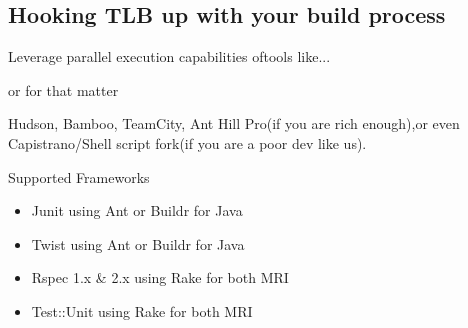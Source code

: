\documentclass{beamer}
\begin{document}
\subsection{Hooking TLB up with your build process}

\begin{frame}{Leverage parallel execution capabilities of}{tools like...}
  \begin{center}
  \end{center}
\end{frame}

\begin{frame}{or for that matter}
  \begin{center}
    {\huge Hudson, Bamboo, TeamCity, Ant Hill Pro}(if you are rich enough),{\huge or even Capistrano/Shell script fork}(if you are a poor dev like us).\\
  \end{center}
\end{frame}

\begin{frame}{Supported Frameworks}
  \begin{centering}
    \begin{itemize}
      \item {\color{green}Junit} using {\color{red}Ant} or {\color{red}Buildr} for {\color{blue}Java}
        \pause
      \item {\color{green}Twist} using {\color{red}Ant} or {\color{red}Buildr} for {\color{blue}Java}
        \pause
      \item {\color{green}Rspec 1.x \& 2.x} using {\color{red}Rake} for both {\color{blue}MRI}
        \pause
      \item {\color{green}Test::Unit} using {\color{red}Rake} for both {\color{blue}MRI}
    \end{itemize}
  \end{centering}
\end{frame}
\end{document}
